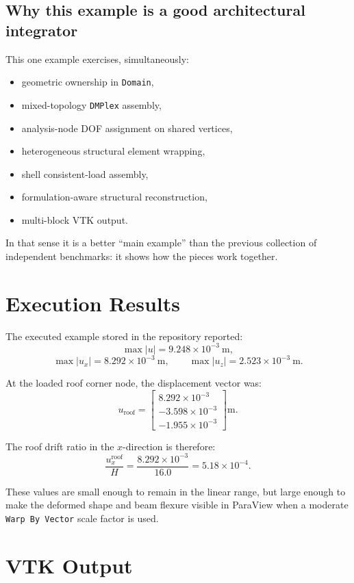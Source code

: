 \subsection{Why this example is a good architectural integrator}

This one example exercises, simultaneously:
\begin{itemize}
  \item geometric ownership in \texttt{Domain},
  \item mixed-topology \texttt{DMPlex} assembly,
  \item analysis-node DOF assignment on shared vertices,
  \item heterogeneous structural element wrapping,
  \item shell consistent-load assembly,
  \item formulation-aware structural reconstruction,
  \item multi-block VTK output.
\end{itemize}

In that sense it is a better ``main example'' than the previous collection of
independent benchmarks: it shows how the pieces work together.

\section{Execution Results}

The executed example stored in the repository reported:
\[
\max |u| = 9.248 \times 10^{-3}\ \mathrm{m},
\]
\[
\max |u_x| = 8.292 \times 10^{-3}\ \mathrm{m},
\qquad
\max |u_z| = 2.523 \times 10^{-3}\ \mathrm{m}.
\]

At the loaded roof corner node, the displacement vector was:
\[
u_\mathrm{roof} =
\begin{bmatrix}
  8.292 \times 10^{-3} \\
 -3.598 \times 10^{-3} \\
 -1.955 \times 10^{-3}
\end{bmatrix}
\mathrm{m}.
\]

The roof drift ratio in the \(x\)-direction is therefore:
\[
\frac{u_x^\mathrm{roof}}{H}
=
\frac{8.292 \times 10^{-3}}{16.0}
= 5.18 \times 10^{-4}.
\]

These values are small enough to remain in the linear range, but large enough
to make the deformed shape and beam flexure visible in ParaView when a moderate
\texttt{Warp By Vector} scale factor is used.

\section{VTK Output}

